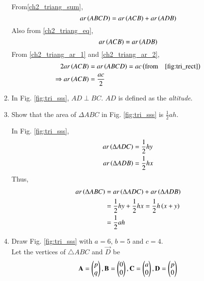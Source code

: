 \begin{enumerate}[label=\arabic*.,ref=\thesubsection.\theenumi]
\solution From\eqref{ch2_triang_sum},
\begin{equation}
\label{ch2_triang_ar_1}
ar\left(ABCD\right) = ar\left(ACB\right) + ar\left(ADB\right)
\end{equation}
Also from \eqref{ch2_triang_eq},
\begin{equation}
\label{ch2_triang_ar_2}
ar\left(ACB\right) = ar\left(ADB\right)
\end{equation}
From \eqref{ch2_triang_ar_1} and \eqref{ch2_triang_ar_2},
\begin{align}
2ar\left(ACB\right) &= ar\left(ABCD\right) = ac \left(\text{from} \quad \eqref{fig:tri_rect}\right)
\\
\Rightarrow ar\left(ACB\right) &= \frac{ac}{2}
\end{align}

%
\item In Fig. 	\ref{fig:tri_sss}, $AD \perp BC$.  $AD$ is defined as the {\em altitude}.
\item
	Show that the area of $\Delta ABC$ in Fig. 	\ref{fig:tri_sss}	is $\frac{1}{2}ah$. 


\solution In Fig. \ref{fig:tri_sss},
\begin{align}
ar\left(\Delta ADC\right) &= \frac{1}{2}hy \\
ar\left(\Delta ADB\right) &= \frac{1}{2}hx 
\end{align}
Thus,
\begin{align}
ar\left(\Delta ABC\right) &= ar\left(\Delta ADC\right) + ar\left(\Delta ADB\right) \\
&= \frac{1}{2}hy + \frac{1}{2}hx = \frac{1}{2}h\left(x+y\right) \\
&= \frac{1}{2}ah
\end{align}
%
\item Draw Fig. \ref{fig:tri_sss} with $a=6$, $b=5$  and $c=4$.  
\label{const:tri_sss}
\\
\solution Let the vertices of  $\triangle ABC$ and $\vec{D}$ be 
\begin{align}
\label{eq:tri_basic}
\mathbf{A} = \begin{pmatrix}p\\q\end{pmatrix}, \mathbf{B} = \begin{pmatrix}0\\0\end{pmatrix}, \mathbf{C} = \begin{pmatrix}a\\0\end{pmatrix}, \mathbf{D} = \begin{pmatrix}p\\0\end{pmatrix}
\end{align}
%


\end{enumerate}
